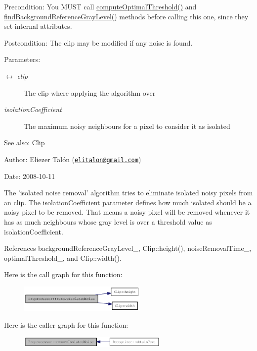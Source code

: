 \begin{Desc}
\item[Precondition:]You MUST call \hyperlink{class_preprocessor_ac2f414d6f4f917419f33f6067eb8634}{computeOptimalThreshold()} and \hyperlink{class_preprocessor_a941f81382bd8e235e4dd12481342be4}{findBackgroundReferenceGrayLevel()} methods before calling this one, since they set internal attributes.\end{Desc}
\begin{Desc}
\item[Postcondition:]The clip may be modified if any noise is found.\end{Desc}
\begin{Desc}
\item[Parameters:]
\begin{description}
\item[\mbox{$\leftrightarrow$} {\em clip}]The clip where applying the algorithm over \item[{\em isolationCoefficient}]The maximum noisy neighbours for a pixel to consider it as isolated\end{description}
\end{Desc}
\begin{Desc}
\item[See also:]\hyperlink{class_clip}{Clip}\end{Desc}
\begin{Desc}
\item[Author:]Eliezer Talón (\href{mailto:elitalon@gmail.com}{\tt elitalon@gmail.com}) \end{Desc}
\begin{Desc}
\item[Date:]2008-10-11\end{Desc}
The 'isolated noise removal' algorithm tries to eliminate isolated noisy pixels from an clip. The isolationCoefficient parameter defines how much isolated should be a noisy pixel to be removed. That means a noisy pixel will be removed whenever it has as much neighbours whose gray level is over a threshold value as isolationCoefficient. 

References backgroundReferenceGrayLevel\_\-, Clip::height(), noiseRemovalTime\_\-, optimalThreshold\_\-, and Clip::width().

Here is the call graph for this function:\nopagebreak
\begin{figure}[H]
\begin{center}
\leavevmode
\includegraphics[width=176pt]{class_preprocessor_a3e047486a0a80f2103f51d7141e41c5_cgraph}
\end{center}
\end{figure}


Here is the caller graph for this function:\nopagebreak
\begin{figure}[H]
\begin{center}
\leavevmode
\includegraphics[width=207pt]{class_preprocessor_a3e047486a0a80f2103f51d7141e41c5_icgraph}
\end{center}
\end{figure}
